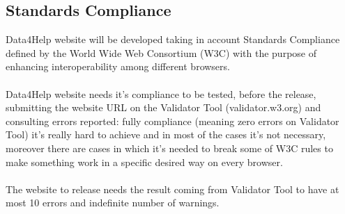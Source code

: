 \subsection{Standards Compliance}
Data4Help website will be developed taking in account Standards Compliance defined by the World Wide Web Consortium (W3C) with the purpose of enhancing interoperability among different browsers. 
\\
\\
Data4Help website needs it’s compliance to be tested, before the release, submitting the website URL on the Validator Tool (validator.w3.org) and consulting errors reported: fully compliance (meaning zero errors on Validator Tool) it’s really hard to achieve and in most of the cases it’s not necessary, moreover there are cases in which it’s needed to break some of W3C rules to make something work in a specific desired way on every browser. 
\\
\\
The website to release needs the result coming from Validator Tool to have at most 10 errors and indefinite number of warnings. 
